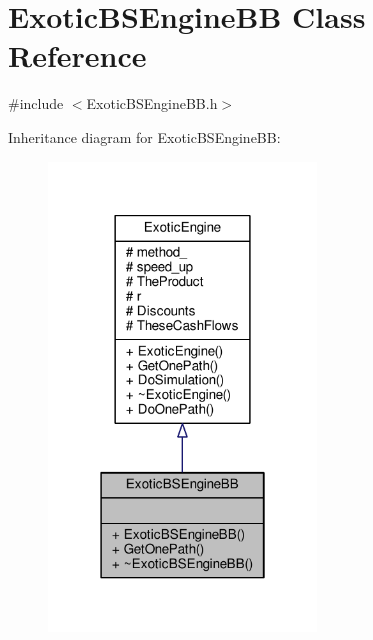 \hypertarget{classExoticBSEngineBB}{}\section{Exotic\+B\+S\+Engine\+BB Class Reference}
\label{classExoticBSEngineBB}


{\ttfamily \#include $<$Exotic\+B\+S\+Engine\+B\+B.\+h$>$}



Inheritance diagram for Exotic\+B\+S\+Engine\+BB\+:
\nopagebreak
\begin{figure}[H]
\begin{center}
\leavevmode
\includegraphics[width=202pt]{classExoticBSEngineBB__inherit__graph}
\end{center}
\end{figure}


